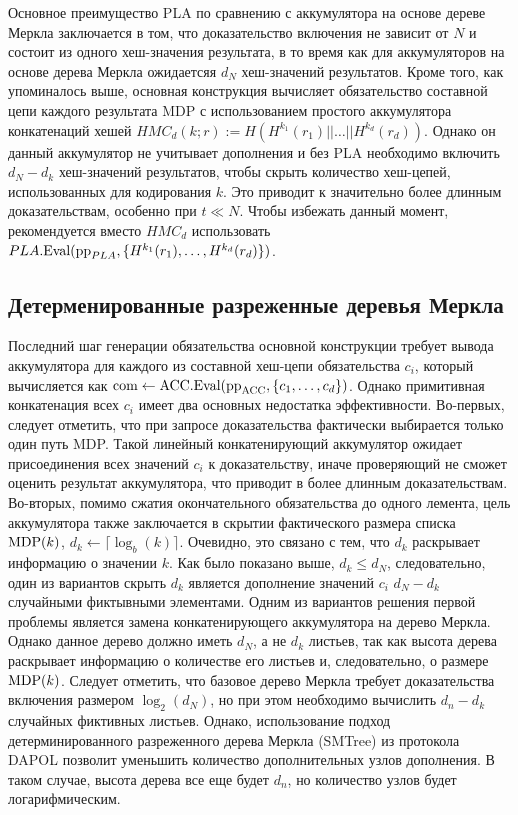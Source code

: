 Основное преимущество PLA по сравнению с аккумулятора на основе дереве Меркла заключается в том, что доказательство включения не зависит от $N$ и состоит из одного хеш-значения результата, в то время как для аккумуляторов на основе дерева Меркла ожидаетсяя $d_N$ хеш-значений результатов.
Кроме того, как упоминалось выше, основная конструкция вычисляет обязательство составной цепи каждого результата MDP с использованием простого аккумулятора конкатенаций хешей $HMC_d(k; r) := H(H^{k_1}(r_1) || \dots || H^{k_d}(r_d))$.
Однако он данный аккумулятор не учитывает дополнения и без PLA необходимо включить $d_N - d_k$ хеш-значений результатов, чтобы скрыть количество хеш-цепей, использованных для кодирования $k$.
Это приводит к значительно более длинным доказательствам, особенно при $t \ll N$.
Чтобы избежать данный момент, рекомендуется вместо $HMC_d$ использовать $PLA.\text{Eval}(\text{pp}_{PLA}, \{H^{k_1}(r_1), \dots, H^{k_d}(r_d)\})$.

\subsection{Детерменированные разреженные деревья Меркла} %
Последний шаг генерации обязательства основной конструкции требует вывода аккумулятора для каждого из составной хеш-цепи обязательства $c_i$, который вычисляется как  $\text{com} \leftarrow \text{ACC}.\text{Eval}(\text{pp}_{\text{ACC}}, \{c_1, \dots, c_d\})$.
Однако примитивная конкатенация всех $c_i$ имеет два основных недостатка эффективности.
Во-первых, следует отметить, что при запросе доказательства фактически выбирается только один путь MDP.
Такой линейный конкатенирующий аккумулятор ожидает присоединения всех значений $c_i$ к доказательству, иначе проверяющий не сможет оценить результат аккумулятора, что приводит в более длинным доказательствам.
Во-вторых, помимо сжатия окончательного обязательства до одного лемента, цель аккумулятора также заключается в скрытии фактического размера списка $\text{MDP}(k)$, $d_k \leftarrow \lceil \log_b(k) \rceil$.
Очевидно, это связано с тем, что $d_k$ раскрывает информацию о значении $k$.
Как было показано выше, $d_k \leq d_N$, следовательно, один из вариантов скрыть $d_k$ является дополнение значений $c_i$ $d_N - d_k$ случайными фиктывными элементами.
Одним из вариантов решения первой проблемы является замена конкатенирующего аккумулятора на дерево Меркла.
Однако данное дерево должно иметь $d_N$, а не $d_k$ листьев, так как высота дерева раскрывает информацию о количестве его листьев и, следовательно, о размере $\text{MDP}(k)$.
Следует отметить, что базовое дерево Меркла требует доказательства включения размером $\log_2(d_N)$, но при этом необходимо вычислить $d_n - d_k$ случайных фиктивных листьев.
Однако, использование подход детерминированного разреженного дерева Меркла (SMTree) из протокола DAPOL \cite{cryptoeprint:2020/468} позволит уменьшить количество дополнительных узлов дополнения.
В таком случае, высота дерева все еще будет $d_n$, но количество узлов будет логарифмическим.

